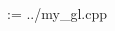 \documentclass[a4j]{jarticle}
\begin{document}
\setlength{\columnsep}{40pt}
\begin{landscape}
 \begin{multicols}{2}


  \makeatletter
  \@tfor\xx@t:=
  {../my_gl.cpp}
  \do{%
   
   {\xx@t}
  }
  \makeatother
 \end{multicols}
\end{landscape}
\end{document}
